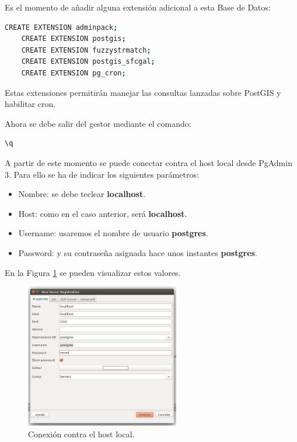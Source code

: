 Es el momento de añadir alguna extensión adicional a esta Base de Datos:

\begin{lstlisting}[language=bash]
	CREATE EXTENSION adminpack;
	CREATE EXTENSION postgis;
	CREATE EXTENSION fuzzystrmatch;
	CREATE EXTENSION postgis_sfcgal;
	CREATE EXTENSION pg_cron;
\end{lstlisting}

Estas extensiones permitirán manejar las consultas lanzadas sobre PostGIS y habilitar cron.

Ahora se debe salir del gestor mediante el comando:
\begin{lstlisting}[language=bash]
	\q
\end{lstlisting}

A partir de este momento se puede conectar contra el host local desde PgAdmin 3. Para ello se ha de indicar los siguientes parámetros:

\begin{itemize}
	\item Nombre: se debe teclear \textbf{localhost}.
	\item Host: como en el caso anterior, será \textbf{localhost}.
	\item Username: usaremos el nombre de usuario \textbf{postgres}.
	\item Password: y su contraseña asignada hace unos instantes \textbf{postgres}.
\end{itemize}

En la Figura \ref{conexion} se pueden visualizar estos valores.

\begin{figure}[h]
  \centering
    \includegraphics[width=0.6\textwidth]{../img/instalacion/conexion.jpg}
  \caption{Conexión contra el host local.}
  \label{conexion}
\end{figure}

